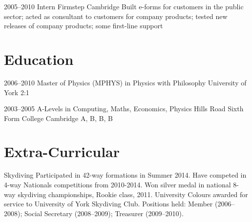 \documentclass[11pt,a4paper,sans]{moderncv}
\begin{document}
\cventry
  {2005--2010}
  {Intern}
  {Firmstep}
  {Cambridge}
  {}
  {
    Built e-forms for customers in the public sector; acted as consultant to customers for company products; tested new releases of company products; some first-line support
  }

\section{Education}

\cventry
  {2006--2010}
  {Master of Physics (MPHYS) in Physics with Philosophy}
  {\newline{}University of York}
  {}
  {2:1}
  {}

\small{
  \cventry
    {2003--2005}
    {A-Levels in Computing, Maths, Economics, Physics}
    {\newline{}Hills Road Sixth Form College}
    {Cambridge}
    {A, B, B, B}
    {}
}

\section{Extra-Curricular}

\cvline
  {Skydiving}
  {
    \small{Participated in 42-way formations in Summer 2014.
    \newline{}Have competed in 4-way Nationals competitions from 2010-2014.
    \newline{}Won silver medal in national 8-way skydiving championships, Rookie class, 2011.
    \newline{}University Colours awarded for service to University of York Skydiving Club. Positions held: Member (2006--2008); Social Secretary (2008--2009); Treasurer (2009--2010).}
  }
\end{document}

